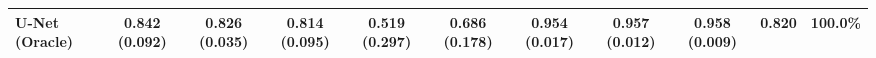 \begin{table*}
{\begin{tabular}{lcccccccccc}

        
        \midrule
        
        U-Net (Oracle)        & 0.842 (0.092) & 0.826 (0.035) & 0.814 (0.095) & 0.519 (0.297) & 0.686 (0.178) & 0.954 (0.017) & 0.957 (0.012) & 0.958 (0.009) & 0.820 & 100.0\% \\
        
        \bottomrule
         
    \end{tabular}}
    \label{tab:metrics_pure}
\end{table*}
